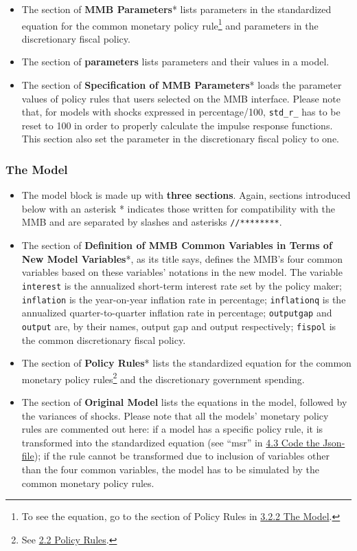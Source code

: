 \documentclass[10pt,a4paper]{article}
\begin{document}
\begin{itemize}
\item The section of \textbf{MMB Parameters}* lists parameters in the standardized equation for the common monetary policy rule\footnote{To see the equation, go to the section of Policy Rules in \hyperref[sec:Model]{3.2.2 The Model}.} and parameters in the discretionary fiscal policy.

\item The section of \textbf{parameters} lists parameters and their values in a model.

\item The section of \textbf{Specification of MMB Parameters}* loads the parameter values of policy rules that users selected on the MMB interface. Please note that, for models with shocks expressed in percentage/100, \texttt{std\_r\_} has to be reset to 100 in order to properly calculate the impulse response functions. This section also set the parameter in the discretionary fiscal policy to one.
\end{itemize}

\subsubsection{The Model}
\label{sec:Model}
\medskip

\begin{itemize}
\item The model block is made up with \textbf{three sections}. Again, sections introduced below with an asterisk * indicates those written for compatibility with the MMB and are separated by slashes and asterisks \texttt{//********}.

\item The section of \textbf{Definition of MMB Common Variables in Terms of New Model Variables}*, as its title says, defines the MMB’s four common variables based on these variables’ notations in the new model. The variable \texttt{interest} is the annualized short-term interest rate set by the policy maker; \texttt{inflation} is the year-on-year inflation rate in percentage; \texttt{inflationq} is the annualized quarter-to-quarter inflation rate in percentage; \texttt{outputgap} and \texttt{output} are, by their names, output gap and output respectively; \texttt{fispol} is the common discretionary fiscal policy.

\item The section of \textbf{Policy Rules}* lists the standardized equation for the common monetary policy rules\footnote{See \hyperref[sec:Rules]{2.2 Policy Rules}.} and the discretionary government spending.

\item The section of \textbf{Original Model} lists the equations in the model, followed by the variances of shocks. Please note that all the models' monetary policy rules are commented out here: if a model has a specific policy rule, it is transformed into the standardized equation (see “msr” in \hyperref[sec:Step3]{4.3 Code the Json-file}); if the rule cannot be transformed due to inclusion of variables other than the four common variables, the model has to be simulated by the common monetary policy rules.
\end{itemize}
\end{document}
